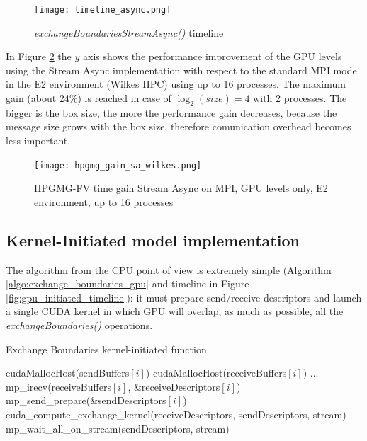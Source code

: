 \documentclass[review]{siamart1116}
\begin{document}
\begin{figure}[h]
\centering
\texttt{[image: timeline\_async.png]}
\caption{\textit{exchangeBoundariesStreamAsync()} timeline}
\label{fig:timeline_async}
\end{figure}

%
In Figure \ref{fig:hpgmg_gain_sa_wilkes} the $y$ axis shows the
performance improvement of the GPU levels using the Stream Async
implementation  with respect to the standard MPI mode in the E2 environment (Wilkes HPC) using up to 16 processes.
%
The maximum gain (about 24\%) is reached in case of $\log_2(size)=4$
with 2 processes. The bigger is the box size, the more the performance
gain decreases, because the message size grows with the box size,
therefore comunication overhead becomes less important.

\begin{figure}[htb]
\centering
\texttt{[image: hpgmg\_gain\_sa\_wilkes.png]}
\caption{HPGMG-FV time gain Stream Async on MPI, GPU levels only, E2 environment, up to 16 processes}
\label{fig:hpgmg_gain_sa_wilkes}
\end{figure}

\subsection{Kernel-Initiated model implementation}\label{sec:kihpgmg}

The algorithm from the CPU point of view is extremely simple (Algorithm \ref{algo:exchange_boundaries_gpu} and timeline in Figure \ref{fig:gpu_initiated_timeline}): it must prepare send/receive descriptors and launch a single CUDA kernel in which GPU will overlap, as much as possible, all the \textit{exchangeBoundaries()} operations.

\begin{algorithm}
\small
\caption{Exchange Boundaries kernel-initiated function}
\label{algo:exchange_boundaries_gpu}
\begin{algorithmic}[1]
\State cudaMallocHost(sendBuffers$[i]$)
\State cudaMallocHost(receiveBuffers$[i]$)
\EndFor
\State ...
                \State mp\_irecv(receiveBuffers$[i]$, \&receiveDescriptors$[i]$)
        \EndFor
                \State mp\_send\_prepare(\&sendDescriptors$[i]$)
        \EndFor
        \State cuda\_compute\_exchange\_kernel(receiveDescriptors, sendDescriptors, stream)
        \State mp\_wait\_all\_on\_stream(sendDescriptors, stream)
\EndFunction
\end{algorithmic}
\end{algorithm}
\end{document}
